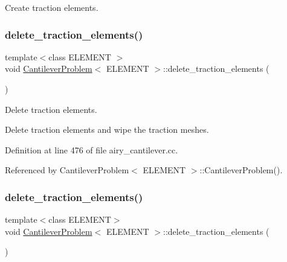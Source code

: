 Create traction elements. 

\mbox{\label{classCantileverProblem_aeb64122ce3783bf36df3696c41e5d2a5}} 
\subsubsection{\texorpdfstring{delete\+\_\+traction\+\_\+elements()}{delete\_traction\_elements()}\hspace{0.1cm}{\footnotesize\ttfamily [1/2]}}
{\footnotesize\ttfamily template$<$class E\+L\+E\+M\+E\+NT $>$ \\
void \hyperlink{classCantileverProblem}{Cantilever\+Problem}$<$ E\+L\+E\+M\+E\+NT $>$\+::delete\+\_\+traction\+\_\+elements (\begin{DoxyParamCaption}{ }\end{DoxyParamCaption})\hspace{0.3cm}{\ttfamily [private]}}



Delete traction elements. 

Delete traction elements and wipe the traction meshes. 

Definition at line 476 of file airy\+\_\+cantilever.\+cc.



Referenced by Cantilever\+Problem$<$ E\+L\+E\+M\+E\+N\+T $>$\+::\+Cantilever\+Problem().

\mbox{\label{classCantileverProblem_aeb64122ce3783bf36df3696c41e5d2a5}} 
\subsubsection{\texorpdfstring{delete\+\_\+traction\+\_\+elements()}{delete\_traction\_elements()}\hspace{0.1cm}{\footnotesize\ttfamily [2/2]}}
{\footnotesize\ttfamily template$<$class E\+L\+E\+M\+E\+NT$>$ \\
void \hyperlink{classCantileverProblem}{Cantilever\+Problem}$<$ E\+L\+E\+M\+E\+NT $>$\+::delete\+\_\+traction\+\_\+elements (\begin{DoxyParamCaption}{ }\end{DoxyParamCaption})\hspace{0.3cm}{\ttfamily [private]}}



